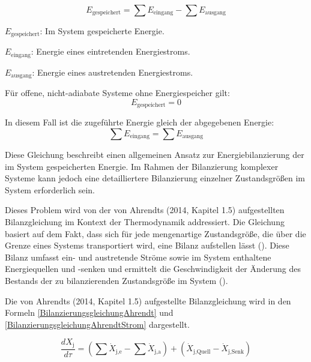 \begin{equation}
E_{\text{gespeichert}} = \sum E_{\text{eingang}} - \sum E_{\text{ausgang}}
\label{energiebilanzierungsgleichung_Rönsch}
\end{equation}

\begin{description}
    \item \(E_{\text{gespeichert}}\): Im System gespeicherte Energie.
    \item \(E_{\text{eingang}}\): Energie eines eintretenden Energiestroms.
    \item \(E_{\text{ausgang}}\): Energie eines austretenden Energiestroms.
    \item Für offene, nicht-adiabate Systeme ohne Energiespeicher gilt:
    \[
    E_{\text{gespeichert}} = 0
    \]
    \item In diesem Fall ist die zugeführte Energie gleich der abgegebenen Energie:
    \[
    \sum E_{\text{eingang}} = \sum E_{\text{ausgang}}
    \]
\end{description}

Diese Gleichung beschreibt einen allgemeinen Ansatz zur Energiebilanzierung der im System gespeicherten Energie. 
Im Rahmen der Bilanzierung komplexer Systeme kann jedoch eine detailliertere Bilanzierung einzelner Zustandsgrößen im System erforderlich sein.

Dieses Problem wird von der von Ahrendts (2014, Kapitel 1.5) aufgestellten Bilanzgleichung im Kontext der Thermodynamik addressiert. 
Die Gleichung basiert auf dem Fakt, dass sich für jede mengenartige Zustandsgröße, die über die Grenze eines Systems transportiert wird, eine 
Bilanz aufstellen lässt (\cite[Kapitel 1.5]{Ahrendts.2014}). 
Diese Bilanz umfasst ein- und austretende Ströme sowie im System enthaltene Energiequellen und -senken und ermittelt die 
Geschwindigkeit der Änderung des Bestands der zu bilanzierenden Zustandsgröße im System (\cite[Kapitel 1.5]{Ahrendts.2014}).

Die von Ahrendts (2014, Kapitel 1.5) aufgestellte Bilanzgleichung wird in den Formeln \eqref{BilanzierungsgleichungAhrendt} und 
\eqref{BilanzierungsgleichungAhrendtStrom} dargestellt.

\begin{equation}
    \frac{dX_{\text{j}}}{d\tau} = (\sum \dot{X}_{\text{j,e}} - \sum \dot{X}_{\text{j,a}}) + (\dot{X}_{\text{j,Quell}} - \dot{X}_{\text{j,Senk}})
    \label{BilanzierungsgleichungAhrendt}
\end{equation}

